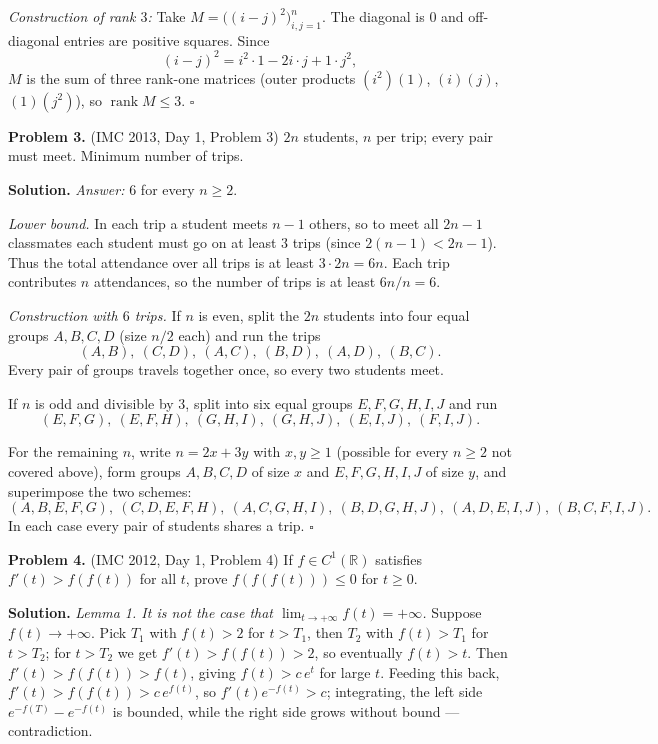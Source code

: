 \documentclass{article}
\newcommand{\R}{\mathbb{R}}
\newcommand{\rank}{\operatorname{rank}}
\begin{document}
\emph{Construction of rank \( 3 \):} Take \( M = \bigl((i - j)^2\bigr)_{i,j=1}^n \). The diagonal is \( 0 \) and off-diagonal entries are positive squares. Since
\[
(i-j)^2 = i^2 \cdot 1 - 2 i \cdot j + 1 \cdot j^2,
\]
\( M \) is the sum of three rank-one matrices (outer products \( (i^2)(1) \), \( (i)(j) \), \( (1)(j^2) \)), so \( \rank M \leq 3 \). \hfill\(\square\)

\bigskip
\textbf{Problem 3.} (IMC 2013, Day 1, Problem 3)
\( 2n \) students, \( n \) per trip; every pair must meet. Minimum number of trips.

\textbf{Solution.} \emph{Answer:} \( 6 \) for every \( n \geq 2 \).

\emph{Lower bound.} In each trip a student meets \( n - 1 \) others, so to meet all \( 2n - 1 \) classmates each student must go on at least \( 3 \) trips (since \( 2(n-1) < 2n - 1 \)). Thus the total attendance over all trips is at least \( 3 \cdot 2n = 6n \). Each trip contributes \( n \) attendances, so the number of trips is at least \( 6n / n = 6 \).

\emph{Construction with \( 6 \) trips.} If \( n \) is even, split the \( 2n \) students into four equal groups \( A, B, C, D \) (size \( n/2 \) each) and run the trips
\[
(A,B),\ (C,D),\ (A,C),\ (B,D),\ (A,D),\ (B,C).
\]
Every pair of groups travels together once, so every two students meet.

If \( n \) is odd and divisible by \( 3 \), split into six equal groups \( E,F,G,H,I,J \) and run
\[
(E,F,G),\ (E,F,H),\ (G,H,I),\ (G,H,J),\ (E,I,J),\ (F,I,J).
\]

For the remaining \( n \), write \( n = 2x + 3y \) with \( x, y \geq 1 \) (possible for every \( n \geq 2 \) not covered above), form groups \( A,B,C,D \) of size \( x \) and \( E,F,G,H,I,J \) of size \( y \), and superimpose the two schemes:
\[
(A,B,E,F,G),\ (C,D,E,F,H),\ (A,C,G,H,I),\ (B,D,G,H,J),\ (A,D,E,I,J),\ (B,C,F,I,J).
\]
In each case every pair of students shares a trip. \hfill\(\square\)

\bigskip
\textbf{Problem 4.} (IMC 2012, Day 1, Problem 4)
If \( f \in C^1(\R) \) satisfies \( f'(t) > f(f(t)) \) for all \( t \), prove \( f(f(f(t))) \leq 0 \) for \( t \geq 0 \).

\textbf{Solution.}
\emph{Lemma 1. It is not the case that \( \lim_{t\to+\infty} f(t) = +\infty \).}
Suppose \( f(t) \to +\infty \). Pick \( T_1 \) with \( f(t) > 2 \) for \( t > T_1 \), then \( T_2 \) with \( f(t) > T_1 \) for \( t > T_2 \); for \( t > T_2 \) we get \( f'(t) > f(f(t)) > 2 \), so eventually \( f(t) > t \). Then \( f'(t) > f(f(t)) > f(t) \), giving \( f(t) > c\, e^{t} \) for large \( t \). Feeding this back, \( f'(t) > f(f(t)) > c\, e^{f(t)} \), so \( f'(t) e^{-f(t)} > c \); integrating, the left side \( e^{-f(T)} - e^{-f(t)} \) is bounded, while the right side grows without bound --- contradiction.
\end{document}
